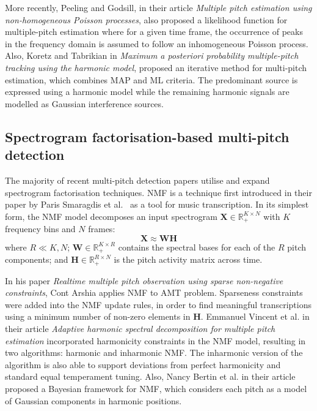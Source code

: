 More recently, Peeling and Godsill, in their article \textit{Multiple pitch estimation using non-homogeneous Poisson
processes}\cite{peeling2011multiple}, also proposed a likelihood function for multiple-pitch estimation where for a
given time frame, the occurrence of peaks in the frequency domain is assumed to follow an inhomogeneous Poisson process.
Also, Koretz and Tabrikian in \textit{Maximum a posteriori probability multiple-pitch tracking using the harmonic
model}\cite{koretz2011maximum}, proposed an iterative method for multi-pitch estimation, which combines \ac{MAP} and
\ac{ML} criteria. The predominant source is expressed using a harmonic model while the remaining harmonic signals are
modelled as Gaussian interference sources\cite{koretz2011maximum}.

\pagebreak

\subsection{Spectrogram factorisation-based multi-pitch detection}\label{subsec:spectrogram-factorisation-based-multi-pitch-detection}
The majority of recent multi-pitch detection papers utilise and expand spectrogram factorisation techniques. \ac{NMF} is
a technique first introduced in their paper by Paris Smaragdis et al.\ \cite{smaragdis2003non} as a tool for music
transcription. In its simplest form, the \ac{NMF} model decomposes an input spectrogram
$\pmb{X} \in \mathbb{R}^{K \times N}_+$ with $K$ frequency bins and $N$ frames: \[ \pmb{X} \approx \pmb{WH} \]
where $R \ll K, N$; $\pmb{W} \in \mathbb{R}^{K \times R}_+$ contains the spectral bases for each of the $R$ pitch
components; and $\pmb{H} \in \mathbb{R}^{R \times N}_+$ is the pitch activity matrix across time.

In his paper \textit{Realtime multiple pitch observation using sparse non-negative constraints}, Cont Arshia applies
\ac{NMF} to \ac{AMT} problem. Sparseness constraints were added into the \ac{NMF} update rules, in order to find
meaningful transcriptions using a minimum number of non-zero elements in $\pmb{H}$. Emmanuel Vincent et al. in their
article \textit{Adaptive harmonic spectral decomposition for multiple pitch estimation}\cite{vincent2009adaptive}
incorporated harmonicity constraints in the \ac{NMF} model, resulting in two algorithms: harmonic and inharmonic
\ac{NMF}. The inharmonic version of the algorithm is also able to support deviations from perfect harmonicity and
standard equal temperament tuning. Also, Nancy Bertin et al. in their article\cite{bertin2010enforcing} proposed
a Bayesian framework for \ac{NMF}, which considers each pitch as a model of Gaussian components in harmonic positions.

